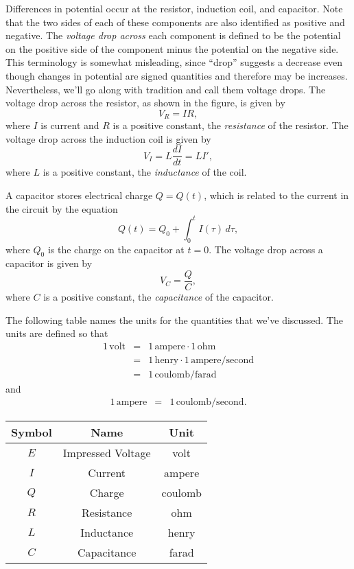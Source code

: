 \documentclass{ximera}
\begin{document}
Differences in potential occur at the resistor, induction coil, and
capacitor. Note that the two sides of each
of these components are also identified as positive and negative. The
\textit{voltage drop across}  each component is defined to be the
potential on the positive side of the component minus the potential on
the negative side. This terminology is somewhat misleading, since
``drop'' suggests a decrease even though changes in potential are
signed quantities and therefore may be increases. Nevertheless,
we'll go along with tradition and call them voltage drops.
The voltage drop across the resistor, as shown in the figure, is given
by
\begin{equation} \label{eq:6.3.1}
V_R=IR,
\end{equation}
where $I$ is current and $R$ is a positive constant, the \textit{resistance} of the resistor. The voltage drop across the induction
coil is given by
\begin{equation} \label{eq:6.3.2}
V_I=L\frac{dI}{dt}=LI',
\end{equation}
where $L$ is a positive constant, the \textit{inductance} of the coil.

A capacitor stores electrical charge $Q=Q(t)$, which is related to
the current in the circuit by the equation
\begin{equation} \label{eq:6.3.3}
Q(t)=Q_0+\int_0^tI(\tau)\,d\tau,
\end{equation}
where $Q_0$ is the charge on the capacitor at $t=0$. The voltage drop
across a capacitor is given by
\begin{equation} \label{eq:6.3.4}
V_C=\frac{Q}{C},
\end{equation}
where $C$ is a positive constant, the \textit{capacitance} of the
capacitor.

The following table names the units for the quantities that we've
discussed. The units are defined so that
\begin{eqnarray*}
1\,\mbox{volt}&=&1\,\mbox{ampere}\cdot1\,\mbox{ohm}\\
&=&1\,\mbox{henry}\cdot1\,\mbox{ampere}/\mbox{second}\\
&=&1\,\mbox{coulomb}/\mbox{farad}
\end{eqnarray*}
and
\begin{eqnarray*}
1\,\mbox{ampere}&=&1\,\mbox{coulomb}/\mbox{second}.
\end{eqnarray*}

\begin{center}
\begin{tabular}{|c|c|c|}
\hline
 {\bf Symbol}&{\bf Name}& {\bf Unit}\\\hline
$E$  &  Impressed Voltage & volt  \\\hline
$I$ & Current & ampere \\\hline
$Q$ & Charge & coulomb\\\hline
$R$ & Resistance& ohm\\\hline
$L$ & Inductance& henry\\\hline
$C$ & Capacitance&farad\\\hline
\end{tabular}
\end{center}
\end{document}
